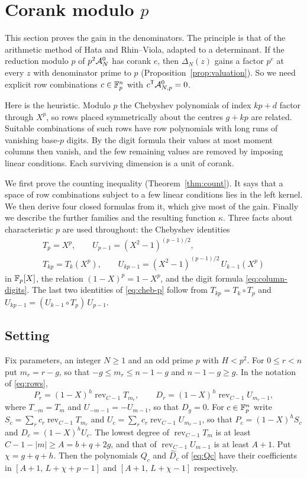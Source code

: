 \section{Corank modulo $p$}\label{sec:content}

This section proves the gain in the denominators. The principle is that of the arithmetic method of Hata
and Rhin--Viola, adapted to a determinant. If the reduction modulo $p$ of $p^2\mathcal A^0_N$ has corank $e$, then
$\Delta_N(z)$ gains a factor $p^e$ at every $z$ with denominator prime to $p$
(Proposition~\ref{prop:valuation}). So we need explicit row combinations $c\in\mathbb F_p^n$ with
$c^{\mathsf T}\mathcal A^0_{N,p}=0$.

Here is the heuristic. Modulo $p$ the Chebyshev polynomials of index $kp+d$ factor through $X^p$, so rows
placed symmetrically about the centres $g+kp$ are related. Suitable combinations of such rows have row
polynomials with long runs of vanishing base-$p$ digits. By the digit formula their values at most moment
columns then vanish, and the few remaining values are removed by imposing linear conditions. Each surviving
dimension is a unit of corank.

We first prove the counting inequality (Theorem~\ref{thm:count}). It says that a space of row combinations
subject to a few linear conditions lies in the left kernel. We then derive four closed formulas from it,
which give most of the gain. Finally we describe the further families and the resulting function $\kappa$.
Three facts about characteristic $p$ are used throughout: the Chebyshev identities
\begin{equation}\label{eq:cheb-p}
 \begin{gathered}
 T_p=X^p,\qquad U_{p-1}=(X^2-1)^{(p-1)/2},\\
 T_{kp}=T_k(X^p),\qquad U_{kp-1}=(X^2-1)^{(p-1)/2}\,U_{k-1}(X^p)
 \end{gathered}
\end{equation}
in $\mathbb F_p[X]$, the relation $(1-X)^p=1-X^p$, and the digit formula \eqref{eq:column-digits}. The last two
identities of \eqref{eq:cheb-p} follow from $T_{kp}=T_k\circ T_p$ and $U_{kp-1}=(U_{k-1}\circ T_p)\,U_{p-1}$.

\subsection{Setting}
Fix parameters, an integer $N\ge1$ and an odd prime $p$ with $H<p^2$. For $0\le r<n$ put $m_r=r-g$, so that
$-g\le m_r\le n-1-g$ and $n-1-g\ge g$. In the notation of \eqref{eq:rows},
\[
 P_r=(1-X)^h\operatorname{rev}_{C-1}T_{m_r},\qquad D_r=(1-X)^h\operatorname{rev}_{C-1}U_{m_r-1},
\]
where $T_{-m}=T_m$ and $U_{-m-1}=-U_{m-1}$, so that $D_g=0$. For $c\in\mathbb F_p^n$ write
$S_c=\sum_rc_r\operatorname{rev}_{C-1}T_{m_r}$ and $U_c=\sum_rc_r\operatorname{rev}_{C-1}U_{m_r-1}$, so that
$P_c=(1-X)^hS_c$ and $D_c=(1-X)^hU_c$. The lowest degree of $\operatorname{rev}_{C-1}T_m$ is at least
$C-1-|m|\ge A=b+q+2g$, and that of $\operatorname{rev}_{C-1}U_{m-1}$ is at least $A+1$. Put $\chi=g+q+h$. Then
the polynomials $Q_c$ and $\widehat D_c$ of \eqref{eq:Qc} have their coefficients in $[A+1,\,L+\chi+p-1]$
and $[A+1,\,L+\chi-1]$ respectively.

